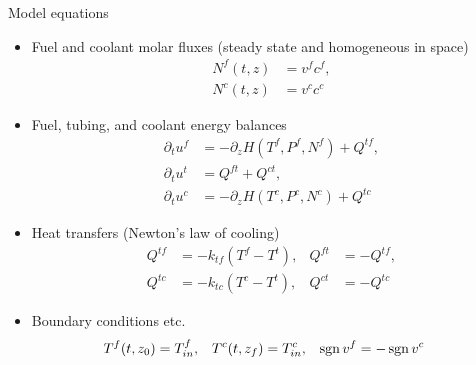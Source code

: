 \begin{frame}{Model equations}
	\begin{scriptsize}
		\begin{itemize}
			\item Fuel and coolant molar fluxes (steady state and homogeneous in space)
			\begin{subequations}
				\begin{align}
					N^f(t, z) &= v^f c^f, \\
					N^c(t, z) &= v^c c^c
				\end{align}
			\end{subequations}
			\item Fuel, tubing, and coolant energy balances
			\begin{subequations}
				\begin{align}
					\partial_t u^f &= -\partial_z H(T^f, P^f, N^f) + Q^{tf}, \\
					\partial_t u^t &= Q^{ft} + Q^{ct}, \\
					\partial_t u^c &= -\partial_z H(T^c, P^c, N^c) + Q^{tc}
				\end{align}
			\end{subequations}
			\item Heat transfers (Newton's law of cooling)
			\begin{subequations}
				\begin{align}
					Q^{tf} &= -k_{tf} (T^f - T^t), &
					Q^{ft} &= -Q^{tf}, \\
					Q^{tc} &= -k_{tc} (T^c - T^t), &
					Q^{ct} &= -Q^{tc}
				\end{align}
			\end{subequations}
			\item Boundary conditions etc.
			\begin{align}
				T^f(t, z_0) &= T_{in}^f, &
				T^c(t, z_f) &= T_{in}^c, &
				\operatorname{sgn} v^f &= -\operatorname{sgn} v^c
			\end{align}
		\end{itemize}
	\end{scriptsize}
\end{frame}

